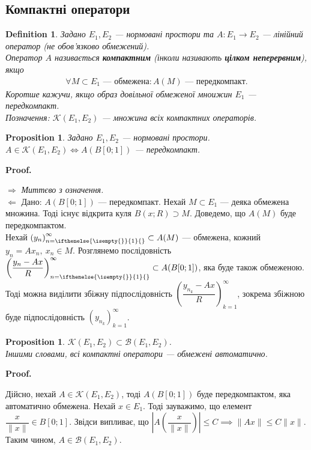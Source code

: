 \documentclass[a4paper, 10pt]{article}
\makeatletter
\def\rightproof{$\boxed{\Rightarrow}$ }
\def\leftproof{$\boxed{\Leftarrow}$ }
\theoremstyle{theoremdd}
\theoremstyle{theoremdd}
\newtheorem{definition}[theorem]{Definition}
\theoremstyle{theoremdd}
\theoremstyle{theoremdd}
\theoremstyle{theoremdd}
\newtheorem{proposition}[theorem]{Proposition}
\theoremstyle{theoremdd}
\theoremstyle{theoremdd}
\theoremstyle{theoremdd}
\newcommand{\sequence}[2][]{\left({#2}\right)_{n=\ifthenelse{\isempty{#1}}{1}{#1}}^{\infty}}
\renewenvironment{proof}[1][Proof.\\]{\par
\pushQED{\hfill \qed}%
\normalfont \topsep6\p@\@plus6\p@\relax
\trivlist
\item\relax
{\bfseries
#1\@addpunct{.}}\hspace\labelsep\ignorespaces
}{%
\popQED\endtrivlist\@endpefalse
}
\makeatother
\begin{document}
\subsection{Компактні оператори}
\begin{definition}
Задано $E_1,E_2$ --- нормовані простори та $A \colon E_1 \to E_2$ --- лінійний оператор (не обов'язково обмежений).\\
Оператор $A$ називається \textbf{компактним} (інколи називають \textbf{цілком неперервним}), якщо
\begin{align*}
\forall M \subset E_1 \text{ --- обмежена}: A(M) \text{ --- передкомпакт.}
\end{align*}
Коротше кажучи, якщо образ довільної обмеженої мноижин $E_1$ --- передкомпакт.\\
Позначення: $\mathcal{K}(E_1,E_2)$ --- множина всіх компактних операторів.
\end{definition}

\begin{proposition}
Задано $E_1,E_2$ --- нормовані простори.\\
$A \in \mathcal{K}(E_1,E_2) \iff A(B[0;1])$ --- передкомпакт.
\end{proposition}

\begin{proof}
\rightproof \textit{Миттєво з означення.}
\bigskip \\
\leftproof Дано: $A(B[0;1])$ --- передкомпакт. Нехай $M \subset E_1$ --- деяка обмежена множина. Тоді існує відкрита куля $B(x;R) \supset M$. Доведемо, що $A(M)$ буде передкомпактом.\\
Нехай $\sequence{y_n} \subset A(M)$ --- обмежена, кожний $y_n = Ax_n,\ x_n \in M$. Розглянемо послідовність $\sequence{\dfrac{y_n - Ax}{R}} \subset A(B[0;1])$, яка буде також обмеженою. Тоді можна виділити збіжну підпослідовність $\left( \dfrac{y_{n_k} - Ax}{R}\right)_{k=1}^\infty$, зокрема збіжною буде підпослідовність $(y_{n_k})_{k=1}^\infty$.
\end{proof}

\begin{proposition}
$\mathcal{K}(E_1,E_2) \subset \mathcal{B}(E_1,E_2)$.\\
Іншими словами, всі компактні оператори --- обмежені автоматично.
\end{proposition}

\begin{proof}
Дійсно, нехай $A \in \mathcal{K}(E_1,E_2)$, тоді $A(B[0;1])$ буде передкомпактом, яка автоматично обмежена. Нехай $x \in E_1$. Тоді зауважимо, що елемент $\dfrac{x}{\|x\|} \in B[0;1]$. Звідси випливає, що $\left| A\left( \dfrac{x}{\|x\|} \right)\right| \leq C \implies \|Ax\| \leq C\|x\|$. Таким чином, $A \in \mathcal{B}(E_1,E_2)$.
\end{proof}
\end{document}

